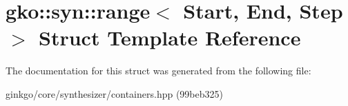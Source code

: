 \hypertarget{structgko_1_1syn_1_1range}{}\section{gko\+:\+:syn\+:\+:range$<$ Start, End, Step $>$ Struct Template Reference}
\label{structgko_1_1syn_1_1range}


The documentation for this struct was generated from the following file\+:\begin{DoxyCompactItemize}
\item 
ginkgo/core/synthesizer/containers.\+hpp (99beb325)\end{DoxyCompactItemize}

